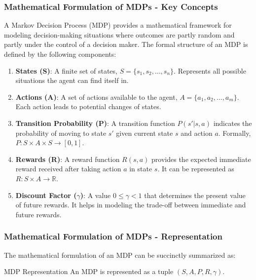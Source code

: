 \documentclass[aspectratio=169]{beamer}
\begin{document}
\begin{frame}[fragile]
    \frametitle{Mathematical Formulation of MDPs - Key Concepts}
    A Markov Decision Process (MDP) provides a mathematical framework for modeling decision-making situations where outcomes are partly random and partly under the control of a decision maker. The formal structure of an MDP is defined by the following components:

    \begin{enumerate}
        \item \textbf{States (S)}: A finite set of states, \( S = \{s_1, s_2, \ldots, s_n\} \). Represents all possible situations the agent can find itself in.
        
        \item \textbf{Actions (A)}: A set of actions available to the agent, \( A = \{a_1, a_2, \ldots, a_m\} \). Each action leads to potential changes of states.

        \item \textbf{Transition Probability (P)}: A transition function \( P(s'|s, a) \) indicates the probability of moving to state \( s' \) given current state \( s \) and action \( a \). Formally, \( P: S \times A \times S \rightarrow [0, 1] \).

        \item \textbf{Rewards (R)}: A reward function \( R(s, a) \) provides the expected immediate reward received after taking action \( a \) in state \( s \). It can be represented as \( R: S \times A \rightarrow \mathbb{R} \).

        \item \textbf{Discount Factor ($\gamma$)}: A value \( 0 \leq \gamma < 1 \) that determines the present value of future rewards. It helps in modeling the trade-off between immediate and future rewards.
    \end{enumerate}
\end{frame}

\begin{frame}[fragile]
    \frametitle{Mathematical Formulation of MDPs - Representation}
    The mathematical formulation of an MDP can be succinctly summarized as:

    \begin{block}{MDP Representation}
        An MDP is represented as a tuple \( (S, A, P, R, \gamma) \).
    \end{block}
\end{frame}
\end{document}
